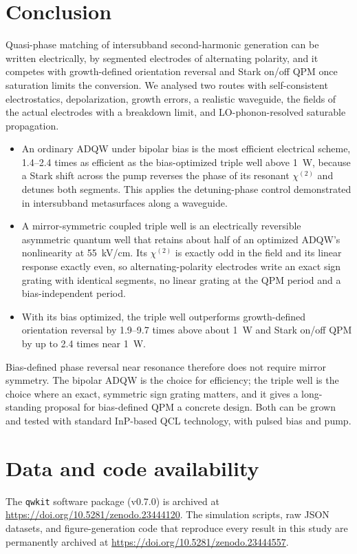 \documentclass[11pt]{article}
\newcommand{\chitwo}{\chi^{(2)}}
\begin{document}
\section{Conclusion}
Quasi-phase matching of intersubband second-harmonic generation can be written electrically, by segmented electrodes of alternating polarity, and it competes with growth-defined orientation reversal and Stark on/off QPM once saturation limits the conversion. We analysed two routes with self-consistent electrostatics, depolarization, growth errors, a realistic waveguide, the fields of the actual electrodes with a breakdown limit, and LO-phonon-resolved saturable propagation.
\begin{itemize}
\item An ordinary ADQW under bipolar bias is the most efficient electrical scheme, 1.4--2.4 times as efficient as the bias-optimized triple well above 1~W, because a Stark shift across the pump reverses the phase of its resonant $\chitwo$ and detunes both segments. This applies the detuning-phase control demonstrated in intersubband metasurfaces \cite{Yu2025} along a waveguide.
\item A mirror-symmetric coupled triple well is an electrically reversible asymmetric quantum well that retains about half of an optimized ADQW's nonlinearity at 55~kV/cm. Its $\chitwo$ is exactly odd in the field and its linear response exactly even, so alternating-polarity electrodes write an exact sign grating with identical segments, no linear grating at the QPM period and a bias-independent period.
\item With its bias optimized, the triple well outperforms growth-defined orientation reversal by 1.9--9.7 times above about 1~W and Stark on/off QPM by up to 2.4 times near 1~W.
\end{itemize}
Bias-defined phase reversal near resonance therefore does not require mirror symmetry. The bipolar ADQW is the choice for efficiency; the triple well is the choice where an exact, symmetric sign grating matters, and it gives a long-standing proposal for bias-defined QPM a concrete design. Both can be grown and tested with standard InP-based QCL technology, with pulsed bias and pump.

\section*{Data and code availability}
The \texttt{qwkit} software package (v0.7.0) is archived at \url{https://doi.org/10.5281/zenodo.23444120}. The simulation scripts, raw JSON datasets, and figure-generation code that reproduce every result in this study are permanently archived at \url{https://doi.org/10.5281/zenodo.23444557}.



\end{document}
